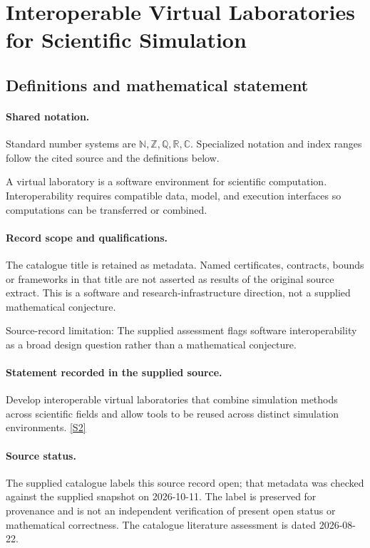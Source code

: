 \documentclass[11pt]{article}
\newcommand{\sref}[2]{\hyperlink{source:#1:#2}{[S#2]}}
\begin{document}
\section{Interoperable Virtual Laboratories for Scientific Simulation}\label{statement}

\subsection{Definitions and mathematical statement}

\paragraph{Shared notation.}Standard number systems are $\mathbb N,\mathbb Z,\mathbb Q,\mathbb R,\mathbb C$. Specialized notation and index ranges follow the cited source and the definitions below.


A virtual laboratory is a software environment for scientific computation. Interoperability requires compatible data, model, and execution interfaces so computations can be transferred or combined.
\paragraph{Record scope and qualifications.}
The catalogue title is retained as metadata. Named certificates, contracts, bounds or frameworks in that title are not asserted as results of the original source extract.
This is a software and research-infrastructure direction, not a supplied mathematical conjecture.

Source-record limitation: The supplied assessment flags software interoperability as a broad design question rather than a mathematical conjecture.
\paragraph{Statement recorded in the supplied source.}
Develop interoperable virtual laboratories that combine simulation methods across scientific fields and allow tools to be reused across distinct simulation environments. \sref{statement}{2}
\paragraph{Source status.}
The supplied catalogue labels this source record open; that metadata was checked against the supplied snapshot on 2026-10-11. The label is preserved for provenance and is not an independent verification of present open status or mathematical correctness. The catalogue literature assessment is dated 2026-08-22.
\end{document}
